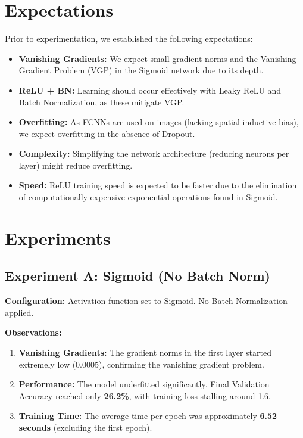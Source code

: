\documentclass{article}
\begin{document}
\section{Expectations}
Prior to experimentation, we established the following expectations:
\begin{itemize}
    \item \textbf{Vanishing Gradients:} We expect small gradient norms and the Vanishing Gradient Problem (VGP) in the Sigmoid network due to its depth.
    \item \textbf{ReLU + BN:} Learning should occur effectively with Leaky ReLU and Batch Normalization, as these mitigate VGP.
    \item \textbf{Overfitting:} As FCNNs are used on images (lacking spatial inductive bias), we expect overfitting in the absence of Dropout.
    \item \textbf{Complexity:} Simplifying the network architecture (reducing neurons per layer) might reduce overfitting.
    \item \textbf{Speed:} ReLU training speed is expected to be faster due to the elimination of computationally expensive exponential operations found in Sigmoid.
\end{itemize}

\section{Experiments}

\subsection{Experiment A: Sigmoid (No Batch Norm)}
\textbf{Configuration:} Activation function set to Sigmoid. No Batch Normalization applied.

\textbf{Observations:}
\begin{enumerate}
    \item \textbf{Vanishing Gradients:} The gradient norms in the first layer started extremely low ($0.0005$), confirming the vanishing gradient problem.
    \item \textbf{Performance:} The model underfitted significantly. Final Validation Accuracy reached only \textbf{26.2\%}, with training loss stalling around 1.6.
    \item \textbf{Training Time:} The average time per epoch was approximately \textbf{6.52 seconds} (excluding the first epoch).
\end{enumerate}
\end{document}
